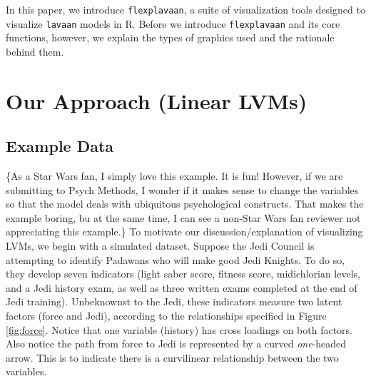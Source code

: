 \documentclass[
  english,
  doc]{apa6}
\begin{document}
In this paper, we introduce \texttt{flexplavaan}, a suite of visualization tools designed to visualize \texttt{lavaan} models in R. Before we introduce \texttt{flexplavaan} and its core functions, however, we explain the types of graphics used and the rationale behind them.

\hypertarget{our-approach-linear-lvms}{%
\section{Our Approach (Linear LVMs)}\label{our-approach-linear-lvms}}

\hypertarget{example-data}{%
\subsection{Example Data}\label{example-data}}

\{As a Star Wars fan, I simply love this example. It is fun! However, if we are submitting to Psych Methods, I wonder if it makes sense to change the variables so that the model deals with ubiquitous psychological constructs. That makes the example boring, bu at the same time, I can see a non-Star Wars fan reviewer not appreciating this example.\}
To motivate our discussion/explanation of visualizing LVMs, we begin with a simulated dataset. Suppose the Jedi Council is attempting to identify Padawans who will make good Jedi Knights. To do so, they develop seven indicators (light saber score, fitness score, midichlorian levels, and a Jedi history exam, as well as three written exams completed at the end of Jedi training). Unbeknownst to the Jedi, these indicators measure two latent factors (force and Jedi), according to the relationships specified in Figure \ref{fig:force}. Notice that one variable (history) has cross loadings on both factors. Also notice the path from force to Jedi is represented by a curved \emph{one}-headed arrow. This is to indicate there is a curvilinear relationship between the two variables.
\end{document}
